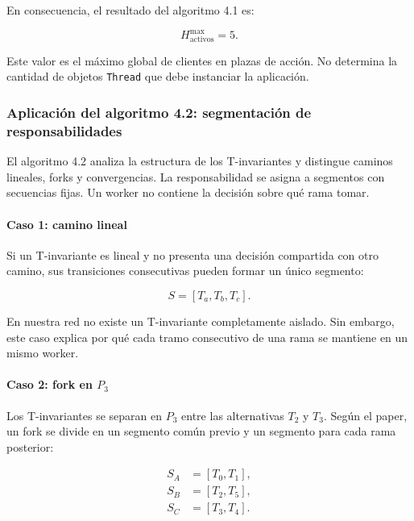 \documentclass[11pt,a4paper]{article}
\begin{document}
En consecuencia, el resultado del algoritmo 4.1 es:

\begin{equation}
    H_{\mathrm{activos}}^{\max}=5.
\end{equation}

Este valor es el máximo global de clientes en plazas de acción. No determina
la cantidad de objetos \texttt{Thread} que debe instanciar la aplicación.

\subsubsection{Aplicación del algoritmo 4.2: segmentación de responsabilidades}

El algoritmo 4.2 analiza la estructura de los T-invariantes y distingue
caminos lineales, forks y convergencias. La responsabilidad se asigna a
segmentos con secuencias fijas. Un worker no contiene la decisión sobre qué
rama tomar.

\paragraph{Caso 1: camino lineal}

Si un T-invariante es lineal y no presenta una decisión compartida con otro
camino, sus transiciones consecutivas pueden formar un único segmento:

\begin{equation}
    S=[T_a,T_b,T_c].
\end{equation}

En nuestra red no existe un T-invariante completamente aislado. Sin embargo,
este caso explica por qué cada tramo consecutivo de una rama se mantiene en un
mismo worker.

\paragraph{Caso 2: fork en $P_3$}

Los T-invariantes se separan en $P_3$ entre las alternativas $T_2$ y $T_3$.
Según el paper, un fork se divide en un segmento común previo y un segmento
para cada rama posterior:

\begin{align*}
    S_A &= [T_0,T_1],\\
    S_B &= [T_2,T_5],\\
    S_C &= [T_3,T_4].
\end{align*}
\end{document}
